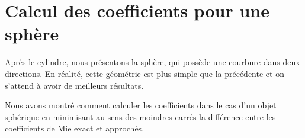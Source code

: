 \chapter{Calcul des coefficients pour une sphère}
\label{sec:sphere}
\minitoc
\newpage
{}
Après le cylindre, nous présentons la sphère, qui possède une courbure dans deux directions. En réalité, cette géométrie est plus simple que la précédente et on s'attend à avoir de meilleurs résultats. 






Nous avons montré comment calculer les coefficients dans le cas d'un objet sphérique en minimisant au sens des moindres carrés la différence entre les coefficients de Mie exact et approchés. 


